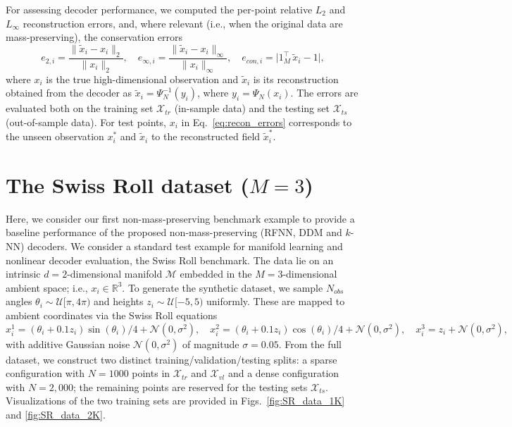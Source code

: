 \documentclass{article}
\begin{document}
For assessing decoder performance, we computed the per-point relative $L_2$ and $L_\infty$ reconstruction errors, and, where relevant (i.e., when the original data are mass-preserving), the conservation errors 
\begin{equation}
    e_{2,i} = \dfrac{\|\tilde{x}_i - x_i\|_2 }{\|x_i\|_2}, \quad
    e_{\infty,i} = \dfrac{\|\tilde{x}_i - x_i\|_\infty }{\|x_i\|_\infty}, \quad e_{con,i} = \bigl| 1_M^\top\, \tilde{x}_{i} - 1 \bigr|,
    \label{eq:recon_errors}
\end{equation}
where $x_i$ is the true high-dimensional observation and $\tilde{x}_i$ is its reconstruction obtained from the decoder as $\tilde{x}_i=\Psi_N^{-1}(y_i)$, where $y_i=\Psi_N(x_i)$. The errors are evaluated both on the training set $\mathcal{X}_{tr}$ (in-sample data) and the testing set $\mathcal{X}_{ts}$ (out-of-sample data). For test points, $x_i$ in Eq.~\eqref{eq:recon_errors} corresponds to the unseen observation $x^*_i$ and $\tilde{x}_i$ to the reconstructed field $\tilde{x}^*_{i}$. 

\renewcommand{\theequation}{E.\arabic{equation}}
\renewcommand{\thefigure}{E.\arabic{figure}}
\renewcommand{\thetable}{E.\arabic{table}}
\setcounter{equation}{0}
\setcounter{figure}{0}
\setcounter{table}{0}
\section{The Swiss Roll dataset (\texorpdfstring{$M=3$}{M=3})} \label{app:SR}

Here, we consider our first non-mass-preserving benchmark example to provide a baseline performance of the proposed non-mass-preserving (RFNN, DDM and $k$-NN) decoders. We consider a standard test example for manifold learning and nonlinear decoder evaluation, the Swiss Roll benchmark. The data lie on an intrinsic $d=2$-dimensional manifold $\mathcal{M}$ embedded in the $M=3$-dimensional ambient space; i.e., $x_i\in \mathbb{R}^3$. To generate the synthetic dataset, we sample $N_{obs}$ angles $\theta_i\sim \mathcal{U}[\pi, 4 \pi)$ and heights $z_i\sim \mathcal{U}[-5,5)$ uniformly. These are mapped to ambient coordinates via the Swiss Roll equations
\begin{equation}
x^1_i = (\theta_i + 0.1 z_i) \sin(\theta_i)/4 + \mathcal{N}(0,\sigma^2), \quad x^2_i = (\theta_i + 0.1 z_i) \cos(\theta_i)/4 + \mathcal{N}(0,\sigma^2), \quad x^3_i = z_i + \mathcal{N}(0,\sigma^2), \label{eq:SwissRolleq}
\end{equation}
with additive Gaussian noise $\mathcal{N}(0,\sigma^2)$ of magnitude $\sigma=0.05$. From the full dataset, we construct two distinct training/validation/testing splits: a sparse configuration with $N=1000$ points in $\mathcal{X}_{tr}$ and $\mathcal{X}_{vl}$ and a dense configuration with $N=2,000$; the remaining points are reserved for the testing sets $\mathcal{X}_{ts}$. Visualizations of the two training sets are provided in Figs.~\ref{fig:SR_data_1K} and \ref{fig:SR_data_2K}.
\end{document}
